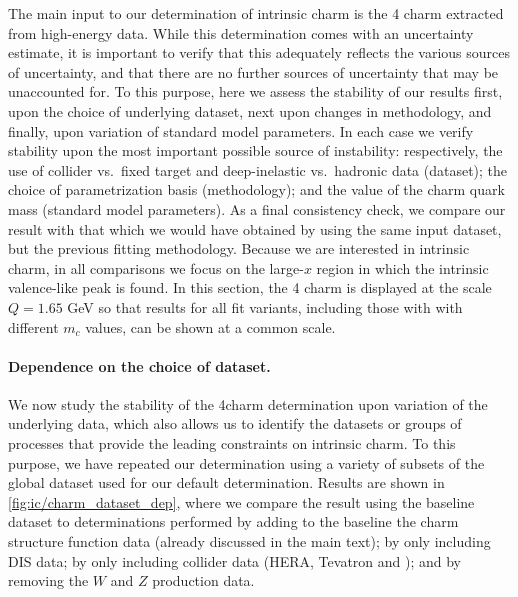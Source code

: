 
The main input to our determination of intrinsic charm is the 4\fns
charm \pdf extracted from high-energy data. While this
determination comes with an uncertainty estimate, it is important to
verify that this adequately reflects the various sources
of uncertainty, and that there are no further sources of uncertainty
that may be unaccounted for.
%
To this purpose, here we assess the
stability of our results first, upon the choice of underlying dataset,
next upon changes in methodology, and finally, upon variation of
standard model parameters.
%
In each case we verify stability upon the
most important possible source of instability: respectively, the use
of collider vs.\ fixed target and deep-inelastic vs.\ hadronic data
(dataset); the choice of parametrization basis (methodology); and the
value of the charm quark mass (standard model parameters).
%
As a final consistency check, we compare our result with that which we
would have obtained by using the same input dataset, but the previous
 fitting methodology.
%
Because we
are interested in intrinsic charm, in all comparisons we focus on
the large-$x$ region in which the intrinsic valence-like peak is found.
%
In this section, the 4\fns
charm \pdf is displayed at the scale $Q = 1.65$ GeV so that
results for all fit variants, including
those with with different $m_c$ values, can be shown at a common scale.

\paragraph{Dependence on the choice of dataset.}
%
We now study the stability of the  4\fns charm determination upon
variation of the
underlying data, which also allows us to
identify the datasets or groups of processes that provide
the leading constraints on intrinsic charm.
%
To this purpose, we have repeated our \pdf
determination using a  variety of subsets of the global dataset used for
our default determination. Results are shown in
\cref{fig:ic/charm_dataset_dep}, where we compare the result using
the 
baseline dataset to determinations performed by adding to the baseline
the  \emc charm
structure function data (already discussed in the main text); by only
including  DIS data; by only including collider data (HERA,
Tevatron and \lhc); and by removing the \lhcb  $W$ and $Z$ production data.

